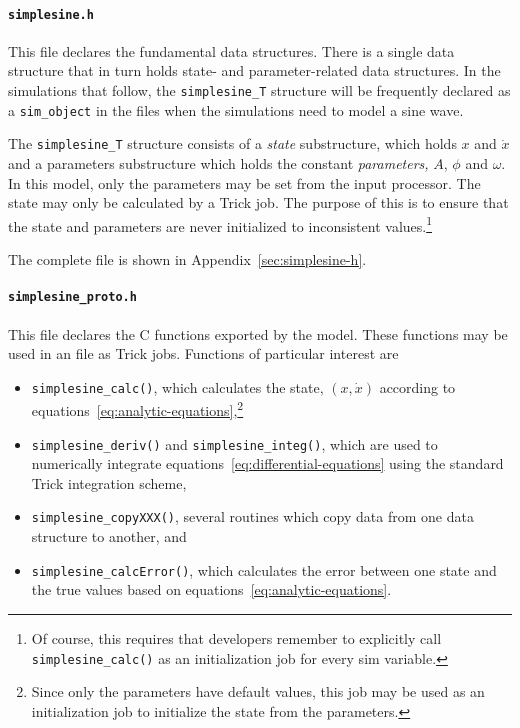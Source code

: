 \paragraph{\tt simplesine.h}
This file declares the fundamental \simplesine data structures.
There is a single data structure that in turn holds state- and parameter-related
data structures.
In the simulations that follow, the {\tt simplesine\_T} structure will be
frequently declared as a {\tt sim\_object} in the \sdefine files
when the simulations need to model a sine wave.

The {\tt simplesine\_T} structure consists of a {\em state} substructure,
which holds $x$ and $\dot{x}$
and a parameters substructure which holds the constant {\em parameters,}
$A$, $\phi$ and $\omega$.
In this model, only the parameters
may be set from the input processor.
The state may only be calculated by a Trick job.
The purpose of this is to ensure that the state and parameters are never
initialized to inconsistent values.\footnote{
  Of course, this requires that developers remember to explicitly
  call {\tt simplesine\_calc()} as an initialization job for every
  \simplesine sim variable.
}

The complete file is shown in Appendix~\ref{sec:simplesine-h}.

\paragraph{\tt simplesine\_proto.h}
This file declares the C functions exported by the \simplesine model.
These functions may be used in an \sdefine file as Trick jobs.
Functions of particular interest are
\begin{itemize}
  \item{\tt simplesine\_calc()}, which calculates the state, $(x, \dot{x})$
    according to equations~\ref{eq:analytic-equations},\footnote{
      Since only the \simplesine parameters have default values,
      this job may be used as an initialization job to initialize
      the state from the parameters.
    }
  \item{\tt simplesine\_deriv()} and {\tt simplesine\_integ()}, which
    are used to numerically integrate equations~\ref{eq:differential-equations}
    using the standard Trick integration scheme,
  \item{\tt simplesine\_copyXXX()}, several routines which copy \simplesine
    data from one data structure to another, and
  \item{\tt simplesine\_calcError()}, which calculates the error between
one \simplesine state and the true values based on equations~\ref{eq:analytic-equations}.
\end{itemize}


